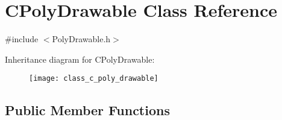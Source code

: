 \hypertarget{class_c_poly_drawable}{\section{C\+Poly\+Drawable Class Reference}
\label{class_c_poly_drawable}
}


{\ttfamily \#include $<$Poly\+Drawable.\+h$>$}

Inheritance diagram for C\+Poly\+Drawable\+:\begin{figure}[H]
\begin{center}
\leavevmode
\texttt{[image: class\_c\_poly\_drawable]}
\end{center}
\end{figure}
\subsection*{Public Member Functions}
